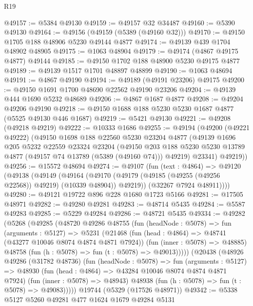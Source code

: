 \begin{lexlean}{R19}
\begin{coremodule}
@49157 := @5384 @49130
@49159 := @49157 @32 @34487
@49160 := @5390 @49130
@49164 := @49156 (@49159 (@5389 (@49160 @32)))
@49170 := @49150 @1705 @188 @48906 @5230 @49144 @4877
@49174 := @49139 @439 @1704 @48902 @48905
@49175 := @1063 @48904
@49179 := @49174 (@4867 @49175 @4877) @49144
@49185 := @49150 @1702 @188 @48900 @5230 @49175 @4877
@49189 := @49139 @1517 @1701 @48897 @48899
@49190 := @1063 @48694
@49191 := @4867 @49190
@49194 := @49189 (@49191 @23206) @49175
@49200 := @49150 @1691 @1700 @48690 @22562 @49190 @23206
@49204 := @49139 @444 @1690 @5232 @48689
@49206 := @4867 @1687 @4877
@49208 := @49204 @49206 @49190
@49218 := @49150 @1688 @188 @5230 @5230 @1687 @4877 (@5525 @49130 @446 @1687)
@49219 := @5421 @49130
@49221 := @49208 (@49218 @49219)
@49222 := @10333 @1686
@49255 := @49194
    (@49200
      (@49221 @49222)
      (@49150
        @1698
        @188
        @22560
        @5230
        @23204
        @4877
        (@49139
          @1696
          @205
          @5232
          @22559
          @23324
          @23204
          (@49150
            @203
            @188
            @5230
            @5230
            @13789
            @4877
            (@49157 @74 @13789 (@5389 (@49160 @74)))
            @49219)
          @23341)
        @49219))
@49256 := @15572 @48694
@49274 := @49107
    (fun (text : @4864) =>
    @49120
      (@49138
        (@49149
          (@49164 (@49170 (@49179 (@49185 (@49255 (@49256 @22568)) @49219) (@10339 @48904)) @49219))
          (@32267 @7924 @48911))))
@49280 := @49121 @19722 @896 @228 @1680 @1723 @5166
@49281 := @17505 @48971
@49282 := @49280 @49281
@49283 := @48714 @5435
@49284 := @5587 @49283
@49285 := @5229 @49284
@49286 := @48721 @5435
@49334 := @49282
    (@5268
      (@49285
        (@48720
          @49286
          @48755
          (fun (headNode : @5078) =>
          fun (arguments : @5127) =>
          @5231
            (@21468
              (fun (head : @4864) => @48741 (@43277 @10046 @8074 @4874 @4871 @7924))
              (fun (inner : @5078) => @48885)
              @48758
              (fun (h : @5078) => fun (t : @5078) => @49013)))))
      (@20438
        (@48926
          @49286
          (@31782 @48736)
          (fun (headNode : @5078) =>
          fun (arguments : @5127) =>
          @48930
            (fun (head : @4864) => @43284 @10046 @8074 @4874 @4871 @7924)
            (fun (inner : @5078) => @48943)
            @48938
            (fun (h : @5078) => fun (t : @5078) => @49083)))))
    @19744
    (@5329 (@17526 @48971))
@49342 := @5338 @5127 @5260 @49281 @477 @1624 @1679 @49284 @5131

\end{coremodule}
\end{lexlean}
